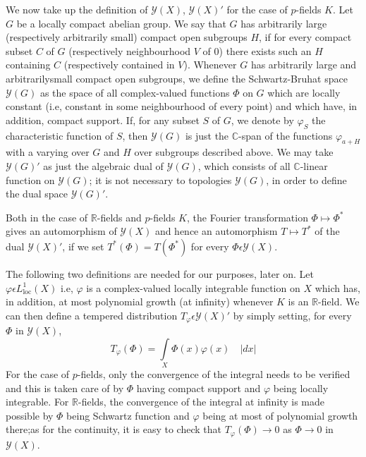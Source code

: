  We now take up the definition of $\mathscr{Y}(X)$, $\mathscr{Y}(X)'$
 for the case of $p$-fields $K$.  Let $G$ be a locally compact abelian
 group. We say that $G$ has arbitrarily large (respectively
 arbitrarily small) compact open subgroups $H$, if for every compact
 subset $C$ of $G$ (respectively neighbourhood $V$ of $0$) there
 exists such an $H$  containing $C$ (respectively contained in
 $V$). Whenever $G$ has arbitrarily large and arbitrarily\pageoriginale small
 compact open subgroups, we define the Schwartz-Bruhat space
 $\mathscr{Y}(G)$ as the space of all complex-valued functions $\Phi$
 on $G$ which are locally constant (i.e, constant in some
 neighbourhood of every point) and which have, in addition, compact
 support. If, for any subset $S$ of $G$, we denote by $\varphi_{S}$ the
 characteristic function of $S$, then $\mathscr{Y}(G)$ is just the
 $\mathbb{C}$-span of the functions $\varphi_{a+H}$ with a varying
 over $G$ and $H$ over subgroups described above. We may take
 $\mathscr{Y}(G)'$ as just the algebraic dual of $\mathscr{Y}(G)$,
 which consists of all $\mathbb{C}$-linear function on
 $\mathscr{Y}(G)$; it is not necessary to topologies $\mathscr{Y}(G)$,
 in order to define the dual space $\mathscr{Y}(G)'$.

 Both in the case of $\mathbb{R}$-fields and $p$-fields $K$, the Fourier
 transformation $\Phi \mapsto \Phi^{\ast}$ gives an automorphism of
 $\mathscr{Y}(X)$ and hence an automorphism $T\mapsto T^{\ast}$ of the
 dual $\mathscr{Y}(X)'$, if we set $T^{\ast}(\Phi)=T(\Phi^{\ast})$ for
 every $\Phi\epsilon\mathscr{Y}(X)$.

 The following two definitions are needed for our purposes, later
 on. Let $\varphi \epsilon L_{\text{loc}}^{1}(X)$ i.e, $\varphi$ is a
 complex-valued locally integrable function on $X$ which has, in
 addition, at most polynomial growth (at infinity) whenever $K$ is an
 $\mathbb{R}$-field. We can then define a tempered distribution
 $T_{\varphi}\epsilon\mathscr{Y}(X)'$ by simply setting, for every
 $\Phi$ in $\mathscr{Y}(X)$,
 \begin{equation*}
   T_{\varphi}(\Phi)=\int\limits_{X}\Phi(x)\varphi(x)\quad|dx|
   \tag{50}\label{chap2:sec1:subsec2:eq50} 
\end{equation*}
For the case of $p$-fields, only the convergence of  the  integral needs
to be verified and this is taken care of by $\Phi$ having compact
support and $\varphi$ being locally integrable. For
$\mathbb{R}$-fields, the convergence of the integral at infinity is
made possible by $\Phi$ being Schwartz function and $\varphi$ being at
most of polynomial growth there;\pageoriginale as for the continuity, it is easy to
check that $T_{\varphi}(\Phi)\rightarrow 0$ as $\Phi\rightarrow 0$ in
$\mathscr{Y}(X)$. 

